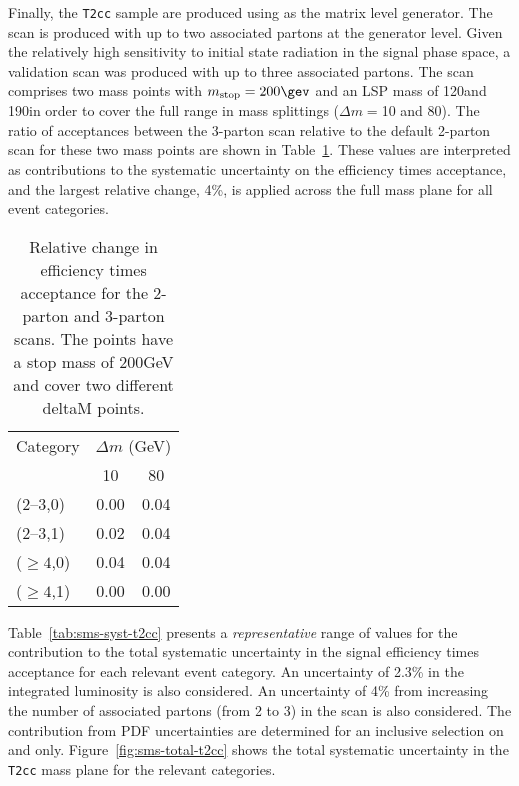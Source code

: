 Finally, the \verb!T2cc! sample are produced using \MADGRAPH as the
matrix level generator. The scan is produced with up to two associated
partons at the generator level. Given the relatively high sensitivity
to initial state radiation in the signal phase space, a validation
scan was produced with up to three associated partons. The scan
comprises two mass points with $m_{\rm stop} = 200\gev$ and an LSP
mass of 120\gev and 190\gev in order to cover the full range in mass
splittings (\ie $\Delta m = $10 and 80\gev). The ratio of acceptances
between the 3-parton scan relative to the default 2-parton scan for
these two mass points are shown in
Table~\ref{tab:sms-t2cc-2v3part}. These values are interpreted as
contributions to the systematic uncertainty on the efficiency times
acceptance, and the largest relative change, 4\%, is applied across
the full mass plane for all event categories.

\begin{table}[!h]
  \caption{Relative change in efficiency times acceptance for the
    2-parton and 3-parton scans. The points have a stop mass of
    200GeV and cover two different deltaM points.}
  \label{tab:sms-t2cc-2v3part}
  \centering
  \begin{tabular}{ lcc }
    \hline
    \hline
    Category     & \multicolumn{2}{c}{$\Delta m$ (GeV)} \\
    \cline{2-3}
                 & 10   & 80                            \\
    \hline
    (2--3,0)     & 0.00 & 0.04                          \\
    (2--3,1)     & 0.02 & 0.04                          \\
    ($\geq 4$,0) & 0.04 & 0.04                          \\
    ($\geq 4$,1) & 0.00 & 0.00                          \\
    \hline
    \hline
  \end{tabular}
\end{table}

Table~\ref{tab:sms-syst-t2cc} presents a {\it representative} range of
values for the contribution to the total systematic uncertainty in the
signal efficiency times acceptance for each relevant event
category. An uncertainty of 2.3\% in the integrated luminosity is also
considered. An uncertainty of 4\% from increasing the number of
associated partons (from 2 to 3) in the scan is also considered. The
contribution from PDF uncertainties are determined for an inclusive
selection on \njet and \nb only. Figure~\ref{fig:sms-total-t2cc} shows
the total systematic uncertainty in the \verb!T2cc! mass plane for the
relevant categories.


